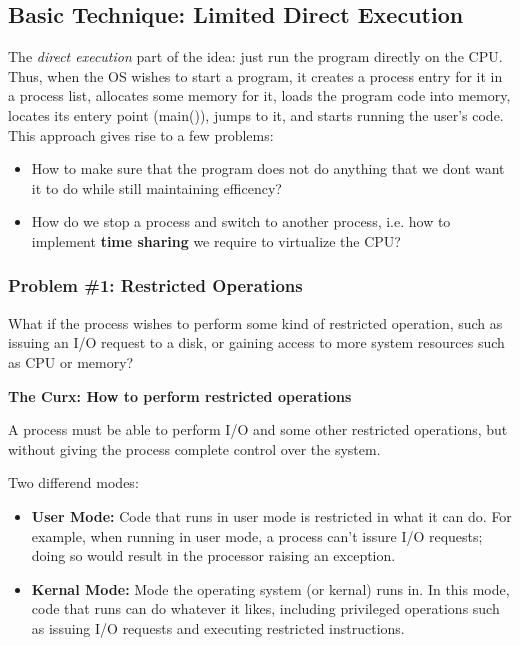 \subsection{Basic Technique: Limited Direct Execution}

The \textit{direct execution} part of the idea: just run the program directly
on the CPU. Thus, when the OS wishes to start a program, it creates a process
entry for it in a process list, allocates some memory for it, loads the program
code into memory, locates its entery point (main()), jumps to it, and starts
running the user's code.\\

This approach gives rise to a few problems:

\begin{itemize}
    \item How to make sure that the program does not do anything that we dont
        want it to do while still maintaining efficency?
    \item How do we stop a process and switch to another process, i.e. how
        to implement \textbf{time sharing} we require to virtualize the CPU?
\end{itemize}

\subsubsection{Problem \#1: Restricted Operations}

What if the process wishes to perform some kind of restricted operation, such
as issuing an I/O request to a disk, or gaining access to more system resources
such as CPU or memory?\\

\begin{tcolorbox}
    \textbf{The Curx: How to perform restricted operations}

    A process must be able
    to perform I/O and some other restricted operations, but without giving the
    process complete control over the system.\\
\end{tcolorbox}

Two differend modes:

\begin{itemize}
    \item \textbf{User Mode:} Code that runs in user mode is restricted in what
        it can do. For example, when running in user mode, a process can't
        issure I/O requests; doing so would result in the processor raising an
        exception.
    \item \textbf{Kernal Mode:} Mode the operating system (or kernal) runs in.
        In this mode, code that runs can do whatever it likes, including
        privileged operations such as issuing I/O requests and executing
        restricted instructions.
\end{itemize}

